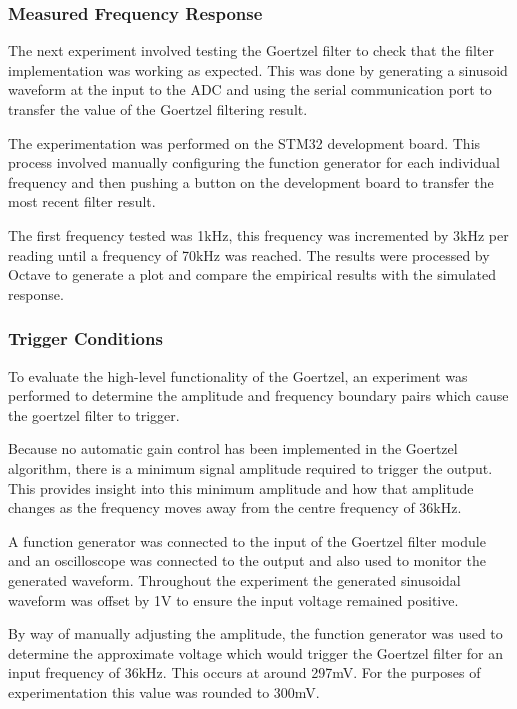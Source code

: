\subsubsection{Measured Frequency Response}
The next experiment involved testing the Goertzel filter to check that the filter implementation was working as expected. This was done by generating a sinusoid waveform at the input to the ADC and using the serial communication port to transfer the value of the Goertzel filtering result. 

The experimentation was performed on the STM32 development board. This process involved manually configuring the function generator for each individual frequency and then pushing a button on the development board to transfer the most recent filter result.

The first frequency tested was 1kHz, this frequency was incremented by 3kHz per reading until a frequency of 70kHz was reached. The results were processed by Octave to generate a plot and compare the empirical results with the simulated response.


\subsubsection{Trigger Conditions}
To evaluate the high-level functionality of the Goertzel, an experiment was performed to determine the amplitude and frequency boundary pairs which cause the goertzel filter to trigger.

Because no automatic gain control has been implemented in the Goertzel algorithm, there is a minimum signal  amplitude required to trigger the output. This provides insight into this minimum amplitude and how that amplitude changes as the frequency moves away from the centre frequency of 36kHz.

A function generator was connected to the input of the Goertzel filter module and an oscilloscope was connected to the output and also used to monitor the generated waveform. Throughout the experiment the generated sinusoidal waveform was offset by 1V to ensure the input voltage remained positive.

By way of manually adjusting the amplitude, the function generator was used to determine the approximate voltage which would trigger the Goertzel filter for an input frequency of 36kHz. This occurs at around 297mV. For the purposes of experimentation this value was rounded to 300mV.

